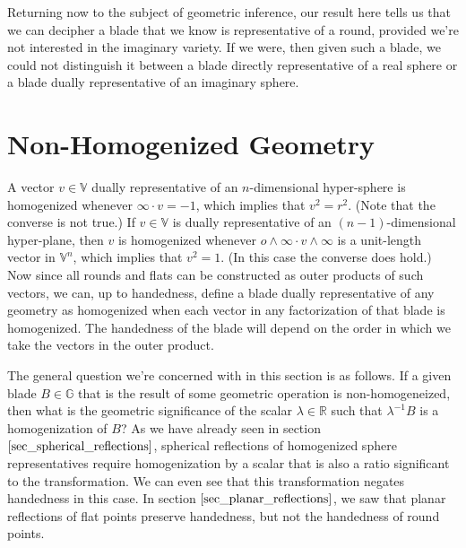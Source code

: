 \documentclass[12pt]{article}
\newcommand{\G}{\mathbb{G}}
\newcommand{\V}{\mathbb{V}}
\newcommand{\R}{\mathbb{R}}
\newcommand{\nvao}{o}
\newcommand{\nvai}{\infty}
\begin{document}
Returning now to the subject of geometric inference, our result here tells us that
we can decipher a blade that we know is representative of a round, provided we're
not interested in the imaginary variety.  If we were, then given such a blade,
we could not distinguish it between a blade directly representative of a real sphere
or a blade dually representative of an imaginary sphere.

\section{Non-Homogenized Geometry}

A vector $v\in\V$ dually representative of an $n$-dimensional hyper-sphere
is homogenized whenever $\nvai\cdot v=-1$, which implies that $v^2=r^2$.
(Note that the converse is not true.)
If $v\in\V$ is dually representative
of an $(n-1)$-dimensional hyper-plane, then $v$ is homogenized whenever
$\nvao\wedge\nvai\cdot v\wedge\nvai$ is a unit-length vector in $\V^n$,
which implies that $v^2=1$.  (In this case the converse does hold.)
Now since all rounds and flats can be constructed as outer products of
such vectors, we can, up to handedness, define a blade dually representative
of any geometry as homogenized when each vector in any factorization
of that blade is homogenized.  The handedness of the blade will depend
on the order in which we take the vectors in the outer product.

The general question we're concerned with in this section is as follows.
If a given blade $B\in\G$ that is the result of some geometric operation is
non-homogeneized, then what is the geometric significance of the scalar
$\lambda\in\R$ such that $\lambda^{-1}B$ is a homogenization of $B$?
As we have already seen in section $\eqref{sec_spherical_reflections}$,
spherical reflections of homogenized sphere representatives require homogenization
by a scalar that is also a ratio significant to the transformation.
We can even see that this transformation negates handedness in this case.
In section $\eqref{sec_planar_reflections}$, we saw that planar reflections
of flat points preserve handedness, but not the handedness of round points.
\end{document}
